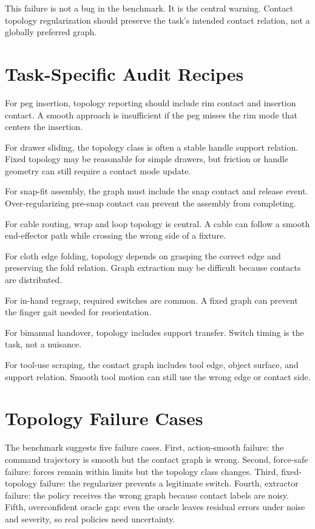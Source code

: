 \documentclass{article}
\begin{document}
This failure is not a bug in the benchmark. It is the central warning. Contact topology regularization should preserve the task's intended contact relation, not a globally preferred graph.

\section{Task-Specific Audit Recipes}

For peg insertion, topology reporting should include rim contact and insertion contact. A smooth approach is insufficient if the peg misses the rim mode that centers the insertion.

For drawer sliding, the topology class is often a stable handle support relation. Fixed topology may be reasonable for simple drawers, but friction or handle geometry can still require a contact mode update.

For snap-fit assembly, the graph must include the snap contact and release event. Over-regularizing pre-snap contact can prevent the assembly from completing.

For cable routing, wrap and loop topology is central. A cable can follow a smooth end-effector path while crossing the wrong side of a fixture.

For cloth edge folding, topology depends on grasping the correct edge and preserving the fold relation. Graph extraction may be difficult because contacts are distributed.

For in-hand regrasp, required switches are common. A fixed graph can prevent the finger gait needed for reorientation.

For bimanual handover, topology includes support transfer. Switch timing is the task, not a nuisance.

For tool-use scraping, the contact graph includes tool edge, object surface, and support relation. Smooth tool motion can still use the wrong edge or contact side.

\section{Topology Failure Cases}

The benchmark suggests five failure cases. First, action-smooth failure: the command trajectory is smooth but the contact graph is wrong. Second, force-safe failure: forces remain within limits but the topology class changes. Third, fixed-topology failure: the regularizer prevents a legitimate switch. Fourth, extractor failure: the policy receives the wrong graph because contact labels are noisy. Fifth, overconfident oracle gap: even the oracle leaves residual errors under noise and severity, so real policies need uncertainty.
\end{document}
